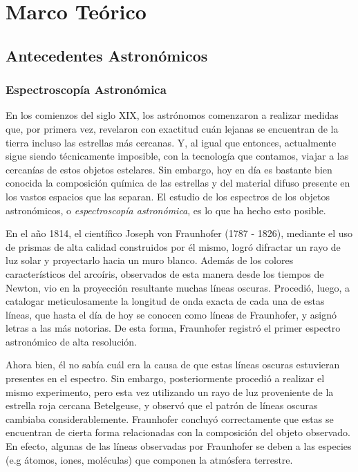 \chapter{Marco Teórico}


\section{Antecedentes Astronómicos}

\subsection{Espectroscopía Astronómica}

En los comienzos del siglo XIX, los astrónomos comenzaron a realizar medidas que, por primera vez, revelaron con exactitud cuán lejanas se encuentran de la tierra incluso las estrellas más cercanas. Y, al igual que entonces, actualmente sigue siendo técnicamente imposible, con la tecnología que contamos, viajar a las cercanías de estos objetos estelares. Sin embargo, hoy en día es bastante bien conocida la composición química de las estrellas y del material difuso presente en los vastos espacios que las separan. El estudio de los espectros de los objetos astronómicos, o \emph{espectroscopía astronómica}, es lo que ha hecho esto posible.

En el año 1814, el científico Joseph von Fraunhofer (1787 - 1826), mediante el uso de prismas de alta calidad construidos por él mismo, logró difractar un rayo de luz solar y proyectarlo hacia un muro blanco. Además de los colores característicos del arcoíris, observados de esta manera desde los tiempos de Newton, vio en la proyección resultante muchas líneas oscuras. Procedió, luego, a catalogar meticulosamente la longitud de onda exacta de cada una de estas líneas, que hasta el día de hoy se conocen como líneas de Fraunhofer, y asignó letras a las más notorias. De esta forma, Fraunhofer registró el primer espectro astronómico de alta resolución.

Ahora bien, él no sabía cuál era la causa de que estas líneas oscuras estuvieran presentes en el espectro. Sin embargo, posteriormente procedió a realizar el mismo experimento, pero esta vez utilizando un rayo de luz proveniente de la estrella roja cercana Betelgeuse, y observó que el patrón de líneas oscuras cambiaba considerablemente. Fraunhofer concluyó correctamente que estas se encuentran de cierta forma relacionadas con la composición del objeto observado. En efecto, algunas de las líneas observadas por Fraunhofer se deben a las especies (e.g átomos, iones, moléculas) que componen la atmósfera terrestre.

